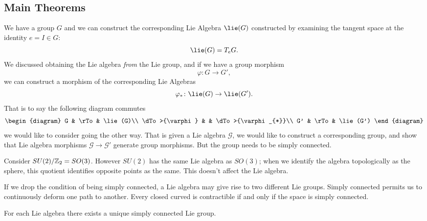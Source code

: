 \subsection{Main Theorems}
We have a group $G$ and we can construct the corresponding Lie
Algebra $\lie(G)$ constructed by examining the tangent space at
the identity $e=I\in G$:
\begin{equation}
\lie(G)=T_{e}G.
\end{equation}
We discussed obtaining the Lie algebra \emph{from} the Lie group,
and if we have a group morphism
\begin{equation}
\varphi\colon G\to G',
\end{equation}
we can construct a morphism of the corresponding Lie Algebras
\begin{equation}
\varphi_{*}\colon \lie(G)\to\lie(G').
\end{equation}
That is to say the following diagram commutes
\begin{equation}
\begin{diagram}
G              & \rTo & \lie(G)\\
\dTo>{\varphi} &      & \dTo>{\varphi_{*}}\\
G'             & \rTo & \lie(G')
\end{diagram}
\end{equation}
we would like to consider going the other way. That is given a
Lie algebra $\mathscr{G}$, we would like to construct a
corresponding group, and show that Lie algebra morphisms
$\mathscr{G}\to\mathscr{G}'$ generate group morphisms. But  the
group needs to be simply connected.

Consider $SU(2)/\Bbb{Z}_{2}=SO(3)$. However $SU(2)$ has the same
Lie algebra as $SO(3)$; when we identify the algebra
topologically as the sphere, this quotient identifies opposite
points as the same. This doesn't affect the Lie algebra.

If we drop the condition of being simply connected, a Lie algebra
may give rise to two different Lie groups. Simply connected
permits us to continuously deform one path to another. Every
closed curved is contractible if and only if the space is simply connected.

\begin{thm}
For each Lie algebra there exists a unique simply connected Lie group.
\end{thm}

